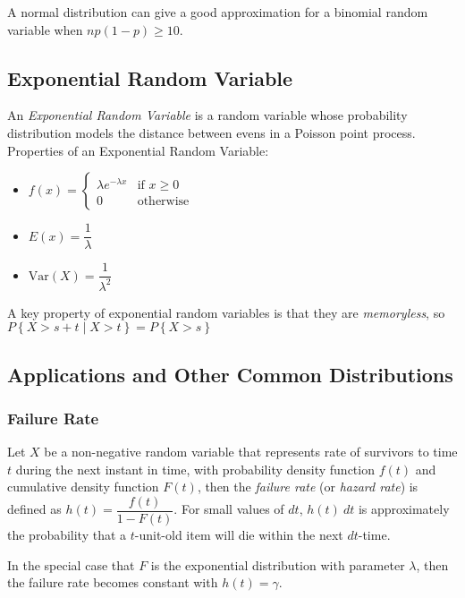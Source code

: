 \documentclass[10pt]{article}
\theoremstyle{definition}
\theoremstyle{theorem}
\begin{document}
		A normal distribution can give a good approximation for a binomial random variable when \(np(1-p) \geq 10\).
		
		\subsection*{Exponential Random Variable}
		An \emph{Exponential Random Variable} is a random variable whose probability distribution models the distance between evens in a Poisson point process. Properties of an Exponential Random Variable:
		\begin{multicols}{3}
			\begin{itemize}
				\item $f(x) = 
				\begin{cases} 
					\lambda e ^ {-\lambda x} & \text{if }  x \geq 0 \\
					0 & \text{otherwise}
				\end{cases}$
				\item $E(x) = \dfrac{1}{\lambda}$
				\item $\text{Var}(X) = \dfrac{1}{\lambda^2}$
			\end{itemize}
		\end{multicols}
		A key property of exponential random variables is that they are \emph{memoryless}, so \(P\left\{X>s+t \mid X >t\right\} = P\left\{X > s \right\}\)
		
		\subsection*{Applications and Other Common Distributions}
		\subsubsection*{Failure Rate}
		Let \(X\) be a non-negative random variable that represents rate of survivors to time \(t\) during the next instant in time, with probability density function \(f(t)\) and cumulative density function \(F(t)\), then the \emph{failure rate} (or \emph{hazard rate}) is defined as \(h(t) = \dfrac{f(t)}{1-F(t)}\). For small values of \(dt\), \(h(t)\: dt\) is approximately the probability that a \(t\)-unit-old item will die within the next \(dt\)-time.
		
		In the special case that $F$ is the exponential distribution with parameter \(\lambda\), then the failure rate becomes constant with \(h(t)=\gamma\).
		
		\newpage
		
\end{document}
